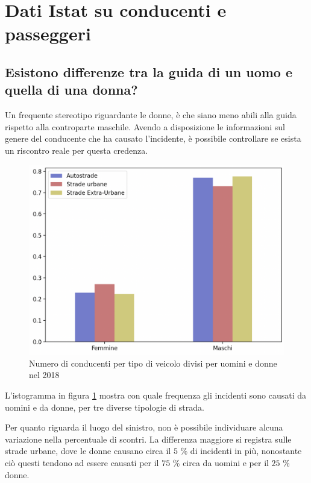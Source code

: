 \documentclass[a4paper,12pt]{report}
\begin{document}
\section{Dati Istat su conducenti e passeggeri}

\subsection{Esistono differenze tra la guida di un uomo e quella di una donna?}

Un frequente stereotipo riguardante le donne, è che 
siano meno abili alla guida rispetto alla controparte maschile. 
Avendo a disposizione le informazioni sul genere del conducente che ha causato l'incidente, 
è possibile controllare se esista un riscontro reale per questa credenza. 

\begin{figure}
    \hfill\includegraphics[width=0.7\linewidth]{../src/incidenti/incidenti_senza_coords/tipo_veicoli/uomo-donna.png}\hspace*{\fill}
    \caption{Numero di conducenti per tipo di veicolo divisi per uomini e donne nel 2018}
    \label{fig:differenza-uomo-donna}
\end{figure}

L'istogramma in figura \ref{fig:differenza-uomo-donna} mostra con quale frequenza 
gli incidenti sono causati da uomini e da donne, per tre diverse tipologie di strada. 

Per quanto riguarda il luogo del sinistro, non è possibile individuare alcuna 
variazione nella percentuale di scontri. 
La differenza maggiore si registra sulle strade urbane, dove le donne causano circa il 
$5$ \% di incidenti in più, nonostante ciò 
questi tendono ad essere causati per il $75$ \% circa da uomini e 
per il $25$ \% donne. 
\end{document}
